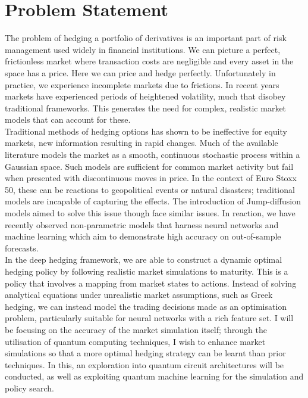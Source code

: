 \documentclass[12pt]{article}
\numberwithin{equation}{section}
\begin{document}
\section{Problem Statement}
The problem of hedging a portfolio of derivatives is an important part of 
risk management used widely in financial institutions. We can picture a perfect, 
frictionless market where transaction costs are negligible and every asset in 
the space has a price. Here we can price and hedge perfectly. Unfortunately in 
practice, we experience incomplete markets due to frictions. In recent years 
markets have experienced periods of heightened volatility, much that disobey 
traditional frameworks. This generates the need for complex, realistic market 
models that can account for these.\\ 
Traditional methods of hedging options has shown to be ineffective for equity 
markets, new information resulting in rapid changes. Much of the available 
literature models the market as a smooth, continuous stochastic process within 
a Gaussian space. Such models are sufficient for common market activity but fail 
when presented with discontinuous moves in price. In the context of Euro Stoxx 50, 
these can be reactions to geopolitical events or natural disasters; traditional
models are incapable of capturing the effects. The introduction of Jump-diffusion 
models aimed to solve this issue though face similar issues. In reaction, we have 
recently observed non-parametric models that harness neural networks and machine 
learning which aim to demonstrate high accuracy on out-of-sample forecasts.
\\
In the deep hedging framework, we are able to construct a dynamic optimal hedging 
policy by following realistic market simulations to maturity. This is a policy 
that involves 
a mapping from market states to actions. Instead of solving analytical equations 
under unrealistic market assumptions, such as Greek hedging, we can instead model
the trading decisions made as an optimisation problem, particularly suitable for 
neural networks with a rich feature set. I will be focusing on the 
accuracy of the market simulation itself; through the utilisation of quantum computing 
techniques, I wish to enhance market simulations so that a more optimal hedging strategy 
can be learnt than prior techniques. In this, an exploration into quantum circuit 
architectures will be conducted, as well as exploiting quantum machine learning 
for the simulation and policy search.

\clearpage
\end{document}
